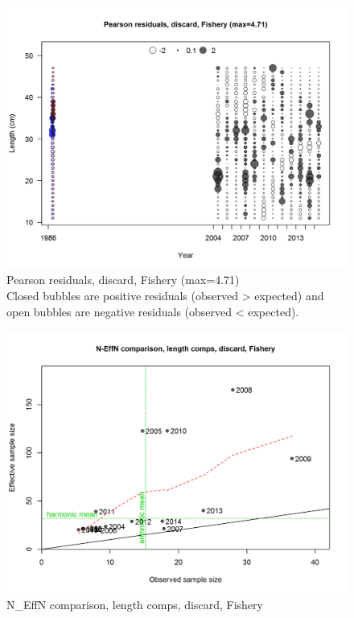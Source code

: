\documentclass[12pt,]{article}
\begin{document}
\begin{figure}
\centering
\includegraphics{./r4ss/plots_mod1/comp_lenfit_residsflt1mkt1.png}
\caption{Pearson residuals, discard, Fishery (max=4.71)\\
Closed bubbles are positive residuals (observed \textgreater{} expected)
and open bubbles are negative residuals (observed \textless{} expected).
\label{fig:mod1_2_comp_lenfit_residsflt1mkt1}}
\end{figure}

\begin{figure}
\centering
\includegraphics{./r4ss/plots_mod1/comp_lenfit_sampsize_flt1mkt1.png}
\caption{N\_EffN comparison, length comps, discard, Fishery
\label{fig:mod1_3_comp_lenfit_sampsize_flt1mkt1}}
\end{figure}
\end{document}
